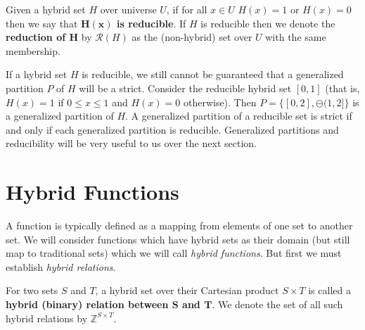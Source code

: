 \begin{definition}
	Given a hybrid set $H$ over universe $U$, 
	if for all $x \in U$ $H(x)=1$ or $H(x)=0$ then we say that \textbf{$\boldsymbol{H(x)}$ is reducible}.
	If $H$ is reducible then we denote the \textbf{reduction of $\boldsymbol{H}$} by $\mathcal{R}(H)$ 
	as the (non-hybrid) set over $U$ with the same membership.  
\end{definition}


If a hybrid set $H$ is reducible, we still cannot be guaranteed that a generalized partition $P$ of $H$ will be a strict.
Consider the reducible hybrid set $[0,1]$ (that is, $H(x)=1$ if $0 \leq x \leq 1$ and $H(x)=0$ otherwise).
Then $P = \big\{ [0,2], \ominus (1,2] \big\}$ is a generalized partition of $H$. 
A generalized partition of a reducible set is strict if and only if each generalized partition is reducible.
Generalized partitions and reducibility will be very useful to us over the next section.




%
%
\section{Hybrid Functions}


A function is typically defined as a mapping from elements of one set to another set.
We will consider functions which have hybrid sets as their domain (but still map to traditional sets) 
which we will call \emph{hybrid functions}.
But first we must establish \emph{hybrid relations}.


\begin{definition}
	For two sets $S$ and $T$, a hybrid set over their Cartesian product $S \times T$ is called a 
	\textbf{hybrid (binary) relation between $\boldsymbol{S}$ and $\boldsymbol{T}$}.
	We denote the set of all such hybrid relations by $\mathbb{Z}^{S \times T}$. 
\end{definition}


